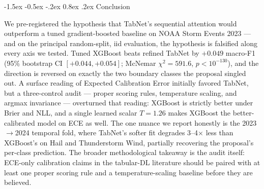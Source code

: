 \documentclass[11pt]{article}
\makeatletter
\renewcommand\section{\@startsection{section}{1}{\z@}%
  {-1.5ex \@plus -0.5ex \@minus -.2ex}%
  {0.8ex \@plus.2ex}%
  {\normalfont\large\bfseries}}
\newcommand{\mF}{macro-F1}
\makeatother
\begin{document}
\section{Conclusion}\label{sec:conclusion}

We pre-registered the hypothesis that TabNet's sequential attention
would outperform a tuned gradient-boosted baseline on NOAA Storm
Events 2023 --- and on the principal random-split, iid evaluation,
the hypothesis is falsified along every axis we tested. Tuned
XGBoost beats refined TabNet by $+0.049$ \mF{} (95\% bootstrap CI
$[+0.044, +0.054]$; McNemar $\chi^2 = 591.6$, $p < 10^{-130}$), and
the direction is reversed on exactly the two boundary classes the
proposal singled out. A surface reading of Expected Calibration
Error initially favored TabNet, but a three-control audit --- proper
scoring rules, temperature scaling, and argmax invariance ---
overturned that reading: XGBoost is strictly better under Brier and
NLL, and a single learned scalar $T = 1.26$ makes XGBoost the
better-calibrated model on ECE as well. The one nuance we report
honestly is the 2023$\rightarrow$2024 temporal fold, where TabNet's
softer fit degrades 3--4$\times$ less than XGBoost's on Hail and
Thunderstorm Wind, partially recovering the proposal's per-class
prediction. The broader methodological takeaway is the audit
itself: ECE-only calibration claims in the tabular-DL literature
should be paired with at least one proper scoring rule and a
temperature-scaling baseline before they are believed.


\end{document}
